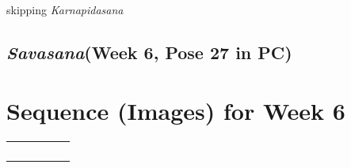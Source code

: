 \documentclass{book}
\newcommand{\apose}[1]{\emph{#1}}
\newcommand{\karn}{\apose{Karnapidasana}}
\newcommand{\sav}{\apose{Savasana}}
\newcommand{\poseFig}[1]{
  \begin{minipage}{1.0in}
    \texttt{[image: Figures/\{"\#1"]}.jpg}
    \captionof{figure}{{#1}}
    \label{fig:\theweek.#1}
    \vspace{1ex}
  \end{minipage}
}
\newcommand{\amsFig}{\poseFig{Adho Mukha Svanasana}}
\newcommand{\ardhalFig}{\poseFig{Ardha Halasana}}
\newcommand{\ardchandFig}{\poseFig{Ardha Chandrasana}}
\newcommand{\ekapadsarvFig}{\poseFig{Eka Pada Sarvangasana}}
\newcommand{\gomuFig}{\poseFig{Gomukasana}}
\newcommand{\halFig}{\poseFig{Halasana}}
\newcommand{\padangFig}{\poseFig{Padangusthasana}}
\newcommand{\parshastpadFig}{\poseFig{Parsva Hasta Padasana}}
\newcommand{\parsvoFig}{\poseFig{Parsvottanasana}}
\newcommand{\paschiFig}{\poseFig{Paschimottanasana}}
\newcommand{\paschbadhastFig}{\poseFig{Paschima Baddha Hastasana}}
\newcommand{\sarvFig}{\poseFig{Salamba Sarvangasana}}
\newcommand{\savFig}{\poseFig{Savasana}}
\newcommand{\tadFig}{\poseFig{Tadasana}}
\newcommand{\urdbadFig}{\poseFig{Urdhva Baddhanguliyasana}}
\newcommand{\utkaFig}{\poseFig{Utkatasana}}
\newcommand{\uttFig}{\poseFig{Uttanasana}}
\newcommand{\utthastpadFig}{\poseFig{Utthita Hasta Padasana}}
\newcommand{\uttparsvaFig}{\poseFig{Utthita Parsvakonasana}}
\newcommand{\utttrikFig}{\poseFig{Utthita Trikonasana}}
\newcommand{\vimFig}{\poseFig{Vimanasana}}
\newcommand{\viraiFig}{\poseFig{Virabhdrasana I}}
\newcommand{\viraiiFig}{\poseFig{Virabhadrasana II}}
\newcommand{\vrkFig}{\poseFig{Vrksasana}}
\newcommand{\PC}[2]{{\normalfont\normalsize \hfill(Week #1, Pose #2 in PC)}}
\newcounter{week}
\newcounter{pose}
\newcommand{\pose}{\subsection}
\begin{document}
    skipping \karn{}

\pose{\sav  \PC{6}{27}}


\section{Sequence (Images) for Week 6}
\label{seqimags:6}

\begin{tabular}{|c|c|c|c|c|}
\tadFig{} & 
\urdbadFig{} & 
\paschbadhastFig{} & 
\gomuFig{} & 
\paschbadhastFig{} \\ \hline
\vrkFig{} & 
\utkaFig{} & 
\utthastpadFig{} & 
\parshastpadFig{} & 
\utttrikFig{}  \\ \hline
\viraiiFig{} & 
\uttparsvaFig{} & 
\vimFig{} & 
\viraiFig{} & 
\ardchandFig{} \\ \hline
\parsvoFig{} & 
\amsFig{} & 
\uttFig{} & 
\padangFig{} & 
\ardhalFig{} \\ \hline
\ekapadsarvFig{} & 
\sarvFig{} & 
\halFig{} & 
\paschiFig{} & 
\savFig{}
\end{tabular}




\end{document}
